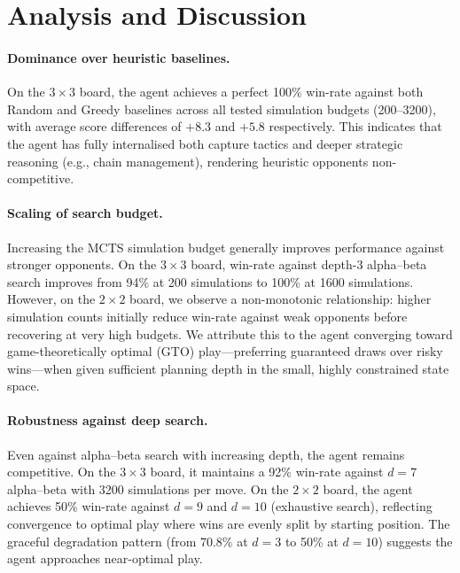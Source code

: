 \documentclass[11pt]{article}
\begin{document}
\section{Analysis and Discussion}
\label{sec:discussion}

\paragraph{Dominance over heuristic baselines.}
On the $3{\times}3$ board, the agent achieves a perfect 100\% win-rate
against both Random and Greedy baselines across all tested simulation
budgets (200--3200), with average score differences of $+8.3$ and $+5.8$
respectively. This indicates that the agent has fully internalised both
capture tactics and deeper strategic reasoning (e.g., chain management),
rendering heuristic opponents non-competitive.

\paragraph{Scaling of search budget.}
Increasing the MCTS simulation budget generally improves performance
against stronger opponents. On the $3{\times}3$ board, win-rate against
depth-3 alpha--beta search improves from 94\% at 200 simulations to
100\% at 1600 simulations. However, on the $2{\times}2$ board, we
observe a non-monotonic relationship: higher simulation counts initially
reduce win-rate against weak opponents before recovering at very high
budgets. We attribute this to the agent converging toward
game-theoretically optimal (GTO) play---preferring guaranteed draws over
risky wins---when given sufficient planning depth in the small, highly
constrained state space.

\paragraph{Robustness against deep search.}
Even against alpha--beta search with increasing depth, the agent remains
competitive. On the $3{\times}3$ board, it maintains a 92\% win-rate
against $d{=}7$ alpha--beta with 3200 simulations per move. On the
$2{\times}2$ board, the agent achieves 50\% win-rate against $d{=}9$
and $d{=}10$ (exhaustive search), reflecting convergence to optimal
play where wins are evenly split by starting position. The graceful
degradation pattern (from 70.8\% at $d{=}3$ to 50\% at $d{=}10$)
suggests the agent approaches near-optimal play.
\end{document}
